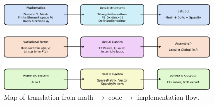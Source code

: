 \begin{landscape}
    \begin{figure}[!htp]
        \centering
        \includegraphics[width=1.6\textwidth]{img/poisson-1d/pde-workflow.pdf}
        \caption{Map of translation from math $\rightarrow$ code $\rightarrow$ implementation flow.}
    \end{figure}
\end{landscape}

\newpage

